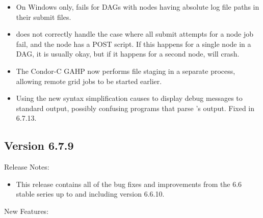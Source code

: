 \begin{itemize}

\item On Windows only,  fails for DAGs with
nodes having absolute log file paths in their submit files.

\item {} does not correctly handle the case where all
submit attempts for a node job fail, and the node has a POST script.
If this happens for a single node in a DAG, it is usually okay,
but if it happens for a second node,  will crash.

\item The Condor-C GAHP now performs file staging in a 
separate process, allowing remote grid jobs to be started earlier.

\item Using the new  syntax simplification causes
 to display debug messages to standard output, possibly
confusing programs that parse 's output.  Fixed in 6.7.13.

\end{itemize}


\subsection*{\label{sec:New-6-7-9}Version 6.7.9}

\noindent Release Notes:

\begin{itemize}

\item This release contains all of the bug fixes and improvements from
  the 6.6 stable series up to and including version 6.6.10.

\end{itemize}

\noindent New Features:

